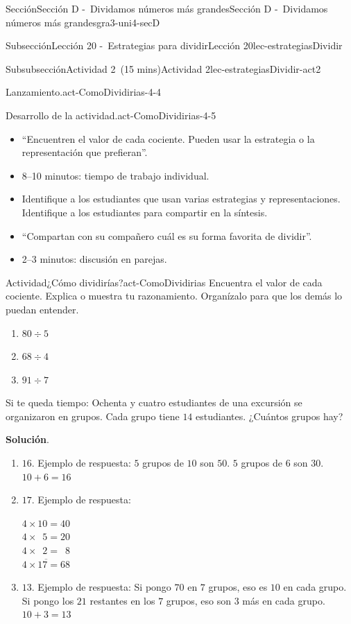 \documentclass[oneside,10pt,]{article}
\newcommand{\blocktitlefont}{\relax}
\begin{document}
\begin{sectionptx}{Sección}{Sección D -~Dividamos números más grandes}{}{Sección D -~Dividamos números más grandes}{}{}{gra3-uni4-secD}
\begin{subsectionptx}{Subsección}{Lección 20 -~Estrategias para dividir}{}{Lección 20}{}{}{lec-estrategiasDividir}
\begin{subsubsectionptx}{Subsubsección}{Actividad 2~(15 mins)}{}{Actividad 2}{}{}{lec-estrategiasDividir-act2}
\begin{paragraphs}{Lanzamiento.}{act-ComoDividirias-4-4}
\begin{itemize}[label=\textbullet]
\end{itemize}
\end{paragraphs}%
\begin{paragraphs}{Desarrollo de la actividad.}{act-ComoDividirias-4-5}%
%
\begin{itemize}[label=\textbullet]
\item{}``Encuentren el valor de cada cociente. Pueden usar la estrategia o la representación que prefieran''.%
\item{}8–10 minutos: tiempo de trabajo individual.%
\item{}Identifique a los estudiantes que usan varias estrategias y representaciones. Identifique a los estudiantes para compartir en la síntesis.%
\item{}``Compartan con su compañero cuál es su forma favorita de dividir''.%
\item{}2–3 minutos: discusión en parejas.%
\end{itemize}
\end{paragraphs}%
\begin{activity}{Actividad}{¿Cómo dividirías?}{act-ComoDividirias}%
Encuentra el valor de cada cociente. Explica o muestra tu razonamiento. Organízalo para que los demás lo puedan entender.%
%
\begin{enumerate}
\item{}\(\displaystyle 80\div 5\)%
\item{}\(\displaystyle 68\div 4\)%
\item{}\(\displaystyle 91\div 7\)%
\end{enumerate}
Si te queda tiempo: Ochenta y cuatro estudiantes de una excursión se organizaron en grupos. Cada grupo tiene \(14\) estudiantes. ¿Cuántos grupos hay?%
\par\smallskip%
\noindent\textbf{\blocktitlefont Solución}.\hypertarget{act-ComoDividirias-3}{}\quad{}%
\begin{enumerate}
\item{}\(16\). Ejemplo de respuesta: \(5\) grupos de \(10\) son \(50\). \(5\) grupos de \(6\) son \(30\). \(10 + 6 = 16\)%
\item{}\(17\). Ejemplo de respuesta:%
\par
\(4 \times 10 =40\)\\
 \(4 \times \phantom{0}5 =20\)\\
 \(4 \times \phantom{0}2 = \phantom{0}8\)\\
 \(\overline {4 \times 17 = 68}\)%
\item{}\(13\). Ejemplo de respuesta: Si pongo \(70\) en \(7\) grupos, eso es \(10\) en cada grupo. Si pongo los \(21\) restantes en los \(7\) grupos, eso son \(3\) más en cada grupo. \(10+3=13\)%

\end{enumerate}
\end{activity}
\end{subsubsectionptx}
\end{subsectionptx}
\end{sectionptx}
\end{document}
